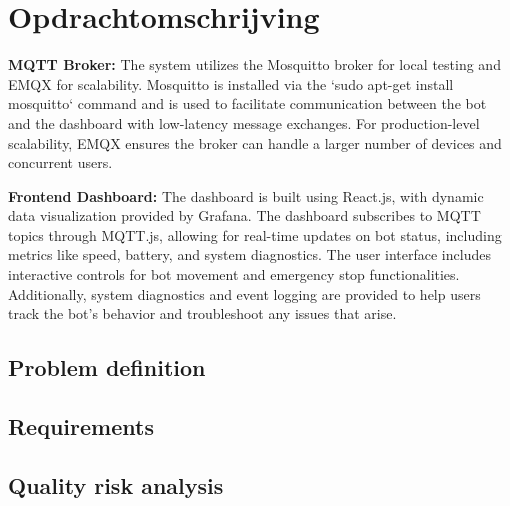 
\section{Opdrachtomschrijving}
\textbf{MQTT Broker:} The system utilizes the Mosquitto broker for local testing and EMQX for scalability. 
Mosquitto is installed via the `sudo apt-get install mosquitto` command and is used to facilitate communication 
between the bot and the dashboard with low-latency message exchanges. For production-level scalability, EMQX 
ensures the broker can handle a larger number of devices and concurrent users. 

\textbf{Frontend Dashboard:} The dashboard is built using React.js, with dynamic data visualization provided by Grafana. 
The dashboard subscribes to MQTT topics through MQTT.js, allowing for real-time updates on bot status, including metrics 
like speed, battery, and system diagnostics. The user interface includes interactive controls for bot movement and emergency 
stop functionalities. Additionally, system diagnostics and event logging are provided to help users track the bot's behavior 
and troubleshoot any issues that arise.

\subsection{Problem definition}

\subsection{Requirements}

\subsection{Quality risk analysis}

